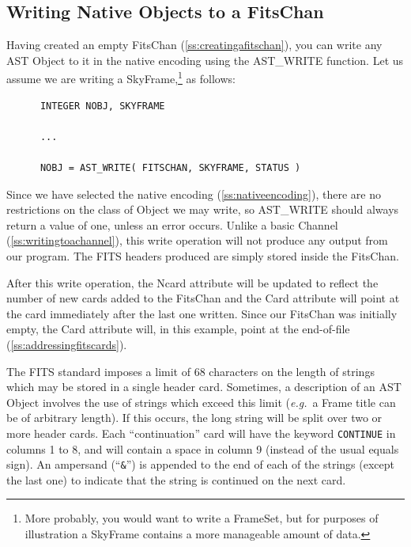 \documentclass[twoside,11pt]{article}
\newcommand{\htmlref}[2]{#1}
\newcommand{\secref}[1]{\S\ref{#1}}
\renewcommand{\secref}[1]{\ref{#1}}
\begin{document}
\subsection{\label{ss:writingnativefits}Writing Native Objects to a FitsChan}

Having created an empty \htmlref{FitsChan}{FitsChan} (\secref{ss:creatingafitschan}), you
can write any AST \htmlref{Object}{Object} to it in the native encoding using the
\htmlref{AST\_WRITE}{AST_WRITE} function. Let us assume we are writing a
\htmlref{SkyFrame}{SkyFrame},\footnote{More probably, you would want to write a \htmlref{FrameSet}{FrameSet},
but for purposes of illustration a SkyFrame contains a more manageable
amount of data.} as follows:

\small
\begin{verbatim}
      INTEGER NOBJ, SKYFRAME

      ...

      NOBJ = AST_WRITE( FITSCHAN, SKYFRAME, STATUS )
\end{verbatim}
\normalsize

Since we have selected the native encoding
(\secref{ss:nativeencoding}), there are no restrictions on the class
of Object we may write, so AST\_WRITE should always return a value of
one, unless an error occurs. Unlike a basic \htmlref{Channel}{Channel}
(\secref{ss:writingtoachannel}), this write operation will not produce
any output from our program. The FITS headers produced are simply
stored inside the FitsChan.

After this write operation, the \htmlref{Ncard}{Ncard} attribute will be updated to
reflect the number of new cards added to the FitsChan and the \htmlref{Card}{Card}
attribute will point at the card immediately after the last one
written. Since our FitsChan was initially empty, the Card attribute
will, in this example, point at the end-of-file
(\secref{ss:addressingfitscards}).

The FITS standard imposes a limit of 68 characters on the length of
strings which may be stored in a single header card. Sometimes, a
description of an AST Object involves the use of strings which exceed
this limit ({\em{e.g.}}\ a \htmlref{Frame}{Frame} title can be of arbitrary length). If
this occurs, the long string will be split over two or more header cards.
Each ``continuation'' card will have the keyword {\tt CONTINUE} in
columns 1 to 8, and will contain a space in column 9 (instead of the
usual equals sign). An ampersand (``{\tt \&}'') is appended to the end of
each of the strings (except the last one) to indicate that the string is
continued on the next card. 
\end{document}
